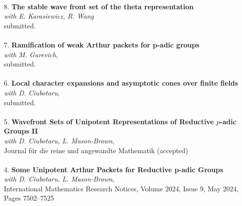 \documentclass{article}
\begin{document}
\underline{\hspace{1.1in}} 
\\
8. \textbf{The stable wave front set of the theta representation} \\%
\textit{with E. Karasiewicz, R. Wang} \\
submitted. \\
\\
7. \textbf{Ramification of weak Arthur packets for p-adic groups} \\%
\textit{with M. Gurevich}, \\
submitted. \\
\\
6. \textbf{Local character expansions and asymptotic cones over finite fields} \\%
\textit{with D. Ciubotaru}, \\
submitted. \\
\\
5. \textbf{Wavefront Sets of Unipotent Representations of Reductive $p$-adic Groups II} \\%
\textit{with D. Ciubotaru, L. Mason-Brown}, \\
Journal für die reine und angewandte Mathematik (accepted) \\
\\
4. \textbf{Some Unipotent Arthur Packets for Reductive p-adic Groups} \\ %
\textit{with D. Ciubotaru, L. Mason-Brown}, \\
International Mathematics Research Notices, Volume 2024, Issue 9, May 2024, Pages 7502–7525 \\
\\
\end{document}

